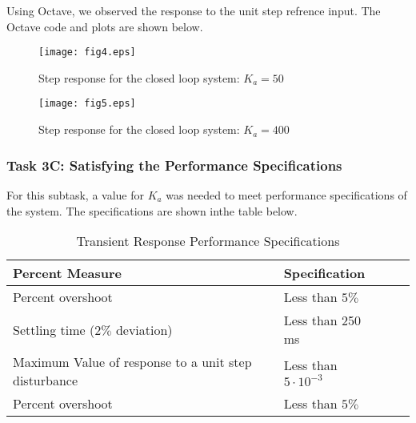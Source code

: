 \documentclass{article}
\begin{document}
Using Octave, we observed the response to the unit step refrence input. The
Octave code and plots are shown below. 



\begin{figure}[H]
  \caption{Step response for the closed loop system: $K_a = 50$}
  \centering
  \texttt{[image: fig4.eps]}
\end{figure}



\begin{figure}[H]
  \caption{Step response for the closed loop system: $K_a = 400$}
  \centering
  \texttt{[image: fig5.eps]}
\end{figure}

\subsubsection*{Task 3C: Satisfying the Performance Specifications}

For this subtask, a value for $K_a$ was needed to meet performance 
specifications of the system. The specifications are shown inthe table below.

\begin{table}[H]
\begin{center}
  \begin{tabular}{ | l | l | l | p{5cm} |}
  \hline
  Percent Measure & Specification\\ \hline 
  Percent overshoot & Less than $5\%$ \\ \hline 
  Settling time ($2\%$ deviation) & Less than 250 ms \\ \hline 
  Maximum Value of response to a unit step disturbance & Less than 
  $5\cdot10^{-3}$ \\ \hline 
  Percent overshoot & Less than $5\%$ \\ \hline 
 \end{tabular}
\end{center}
\caption{Transient Response Performance Specifications}
\label{table:3}
\end{table}
\end{document}
